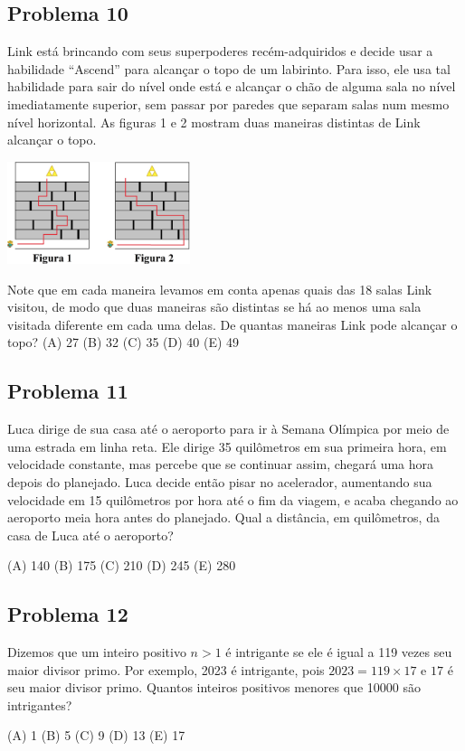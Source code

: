 \documentclass[12pt]{article}
\begin{document}
\subsection{Problema 10}
\begin{tcolorbox}[statementbox]
Link está brincando com seus superpoderes recém-adquiridos e decide usar a habilidade “Ascend” para alcançar o topo de um labirinto. Para isso, ele usa tal habilidade para sair do nível onde está e alcançar o chão de alguma sala no nível imediatamente superior, sem passar por paredes que separam salas num mesmo nível horizontal. As figuras 1 e 2 mostram duas maneiras distintas de Link alcançar o topo.

    \begin{center}
    \includegraphics[width=0.4\textwidth]{fourth.png}
  \end{center}


Note que em cada maneira levamos em conta apenas quais das 18 salas Link visitou, de modo que duas maneiras são distintas se há ao menos uma sala visitada diferente em cada uma delas. De quantas maneiras Link pode alcançar o topo?
(A) 27 (B) 32 (C) 35 (D) 40 (E) 49
\end{tcolorbox}
\clearpage

\subsection{Problema 11}
\begin{tcolorbox}[statementbox]
Luca dirige de sua casa até o aeroporto para ir à Semana Olímpica por meio de uma estrada em linha reta. Ele dirige 35 quilômetros em sua primeira hora, em velocidade constante, mas percebe que se continuar assim, chegará uma hora depois do planejado. Luca decide então pisar no acelerador, aumentando sua velocidade em 15 quilômetros por hora até o fim da viagem, e acaba chegando ao aeroporto meia hora antes do planejado. Qual a distância, em quilômetros, da casa de Luca até o aeroporto?

(A) 140 (B) 175 (C) 210 (D) 245 (E) 280
\end{tcolorbox}
\clearpage

\subsection{Problema 12}
\begin{tcolorbox}[statementbox]
Dizemos que um inteiro positivo $n>1$ é intrigante se ele é igual a 119 vezes seu maior divisor primo. Por exemplo, 2023 é intrigante, pois $2023 = 119 \times 17$ e $17$ é seu maior divisor primo. Quantos inteiros positivos menores que 10000 são intrigantes?

(A) 1 (B) 5 (C) 9 (D) 13 (E) 17
\end{tcolorbox}
\clearpage
\end{document}
